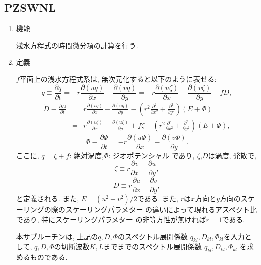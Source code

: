 \documentclass[a4j,fleqn]{jarticle}
\begin{document}

\subsection{PZSWNL}

\begin{enumerate}

\item 機能 

浅水方程式の時間微分項の計算を行う.

\item 定義

$f$平面上の浅水方程式系は, 無次元化すると以下のように表せる:
\begin{equation}
\dot{q}\equiv\frac{\partial q}{\partial t}
=-r\frac{\partial(uq)}{\partial x}
-\frac{\partial(vq)}{\partial y}
=-r\frac{\partial(u\zeta)}{\partial x}
 -\frac{\partial(v\zeta)}{\partial y}-fD,
\end{equation} 
\begin{eqnarray}
\dot{D}\equiv\frac{\partial D}{\partial t}
&=&r\frac{\partial(vq)}{\partial x}
-\frac{\partial(uq)}{\partial y}
-\left(r^2\frac{\partial^2}{\partial x^2}
  +\frac{\partial^2}{\partial y^2}\right)(E+\Phi)\\
&=&r\frac{\partial(v\zeta)}{\partial x}
-\frac{\partial(u\zeta)}{\partial y}+f\zeta
-\left(r^2\frac{\partial^2}{\partial x^2}
  +\frac{\partial^2}{\partial y^2}\right)(E+\Phi),
\end{eqnarray}  
\begin{equation}
\dot{\Phi}\equiv\frac{\partial \Phi}{\partial t}
=-r\frac{\partial(u\Phi)}{\partial x}
-\frac{\partial(v\Phi)}{\partial y}.
\end{equation}
ここに, $q=\zeta+f$: 絶対渦度,$\Phi$: ジオポテンシャル
であり, $\zeta$,$D$は渦度, 発散で,
\begin{equation}
\zeta\equiv
r\frac{\partial v}{\partial x}
-\frac{\partial u}{\partial y},
\end{equation}
\begin{equation}
D\equiv
r\frac{\partial u}{\partial x}
+\frac{\partial v}{\partial y},
\end{equation}
と定義される. また, $E=(u^2+v^2)/2$である.
また, $r$は$x$方向と$y$方向のスケーリングの際のスケーリングパラメター
の違いによって現れるアスペクト比であり, 特にスケーリングパラメター
の非等方性が無ければ$r=1$である.

本サブルーチンは, 上記の$q,D,\Phi$のスペクトル展開係数
$q_{kl},D_{kl},\Phi_{kl}$を入力として,
$\dot{q},\dot{D},\dot{\Phi}$の切断波数$K,L$までまでのスペクトル展開係数
$\dot{q}_{kl},\dot{D}_{kl},\dot{\Phi}_{kl}$
を求めるものである.


\end{enumerate}
\end{document}
